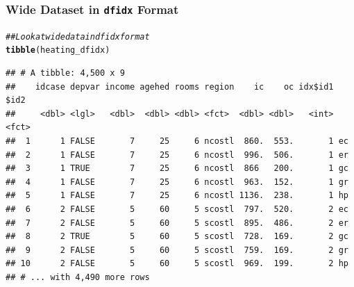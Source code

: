 \documentclass{beamer}\usepackage[]{graphicx}\usepackage[]{xcolor}
\makeatletter
\newcommand{\hlcom}[1]{\textcolor[rgb]{0.678,0.584,0.686}{\textit{#1}}}%
\newcommand{\hlstd}[1]{\textcolor[rgb]{0.345,0.345,0.345}{#1}}%
\newcommand{\hlkwd}[1]{\textcolor[rgb]{0.737,0.353,0.396}{\textbf{#1}}}%
\newenvironment{kframe}{%
 \def\at@end@of@kframe{}%
 \ifinner\ifhmode%
  \def\at@end@of@kframe{\end{minipage}}%
  \begin{minipage}{\columnwidth}%
 \fi\fi%
 \def\FrameCommand##1{\hskip\@totalleftmargin \hskip-\fboxsep
 \colorbox{shadecolor}{##1}\hskip-\fboxsep
     \hskip-\linewidth \hskip-\@totalleftmargin \hskip\columnwidth}%
 \MakeFramed {\advance\hsize-\width
   \@totalleftmargin\z@ \linewidth\hsize
   \@setminipage}}%
 {\par\unskip\endMakeFramed%
 \at@end@of@kframe}
\newenvironment{knitrout}{}{} %
\makeatother
\begin{document}
\begin{frame}[fragile]\frametitle{Wide Dataset in \texttt{dfidx} Format}
\begin{knitrout}\footnotesize
{}\color{fgcolor}\begin{kframe}
\begin{alltt}
\hlcom{## Look at wide data in dfidx format}
\hlkwd{tibble}\hlstd{(heating_dfidx)}
\end{alltt}
\begin{verbatim}
## # A tibble: 4,500 x 9
##    idcase depvar income agehed rooms region    ic    oc idx$id1 $id2 
##     <dbl> <lgl>   <dbl>  <dbl> <dbl> <fct>  <dbl> <dbl>   <int> <fct>
##  1      1 FALSE       7     25     6 ncostl  860.  553.       1 ec   
##  2      1 FALSE       7     25     6 ncostl  996.  506.       1 er   
##  3      1 TRUE        7     25     6 ncostl  866   200.       1 gc   
##  4      1 FALSE       7     25     6 ncostl  963.  152.       1 gr   
##  5      1 FALSE       7     25     6 ncostl 1136.  238.       1 hp   
##  6      2 FALSE       5     60     5 scostl  797.  520.       2 ec   
##  7      2 FALSE       5     60     5 scostl  895.  486.       2 er   
##  8      2 TRUE        5     60     5 scostl  728.  169.       2 gc   
##  9      2 FALSE       5     60     5 scostl  759.  169.       2 gr   
## 10      2 FALSE       5     60     5 scostl  969.  199.       2 hp   
## # ... with 4,490 more rows
\end{verbatim}
\end{kframe}
\end{knitrout}
\end{frame}
\end{document}
